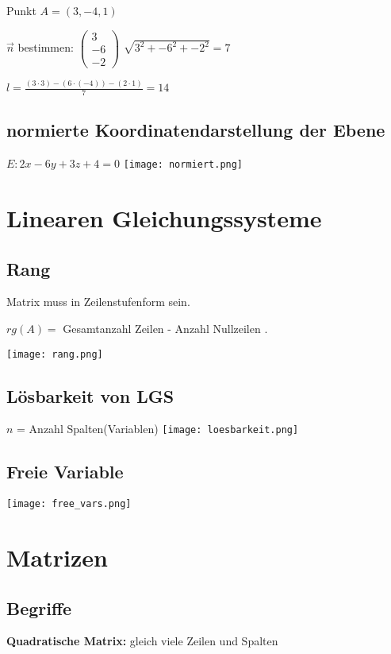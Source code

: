 \begin{multicols*}{3}
    {Punkt $A = (3,-4,1)$}


    { $\vec{n}$ bestimmen: $\begin{pmatrix}
                3  \\
                -6 \\
                -2
            \end{pmatrix}$ $\sqrt{3^2+-6^2+-2^2} = 7$}

    { $l = \frac{(3 \cdot 3) -(6 \cdot (-4)) - (2 \cdot 1)}{7} = 14$}
    \WhiteSpace


    \subsection{  normierte Koordinatendarstellung der Ebene}
    {$E: 2x - 6y +3z + 4 = 0$}
    \texttt{[image: normiert.png]}

    \vfill\null
    \columnbreak
    \section{Linearen Gleichungssysteme}
    \WhiteSpace
    \subsection{Rang}
    {Matrix muss in Zeilenstufenform sein.}

    {$rg(A) = $ Gesamtanzahl Zeilen - Anzahl Nullzeilen .}

    \texttt{[image: rang.png]}

    \subsection{Lösbarkeit von LGS}
    {$ n $ = Anzahl Spalten(Variablen)}
    \texttt{[image: loesbarkeit.png]}
    \subsection{Freie Variable}

    \texttt{[image: free\_vars.png]}

    \vfill\null
    \columnbreak
    \section{Matrizen}
    \subsection{Begriffe}
    {\textbf{Quadratische Matrix:} gleich viele Zeilen und Spalten}


\end{multicols*}
